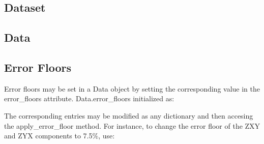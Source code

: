 \documentclass[letterpaper,10pt,english]{sphinxmanual}
\begin{document}
\subsection{Dataset}
\label{\detokenize{content/api_core/data_structures:dataset}}\label{\detokenize{content/api_core/data_structures:id1}}

\subsection{Data}
\label{\detokenize{content/api_core/data_structures:data}}\label{\detokenize{content/api_core/data_structures:id2}}

\subsection{Error Floors}
\label{\detokenize{content/api_core/data_structures:error-floors}}\label{\detokenize{content/api_core/data_structures:id3}}
Error floors may be set in a Data object by setting the corresponding value in the error\_floors attribute.
Data.error\_floors initialized as:

\begin{sphinxVerbatim}[commandchars=\\\{\}]
   
                  
                  
                  
                  
\end{sphinxVerbatim}

The corresponding entries may be modified as any dictionary and then accesing the apply\_error\_floor method. For instance, to change the error floor of the ZXY and ZYX components to 7.5\%, use:

\begin{sphinxVerbatim}[commandchars=\\\{\}]
\PYG{p}{[}\PYG{p}{]}  
\end{sphinxVerbatim}
\end{document}

